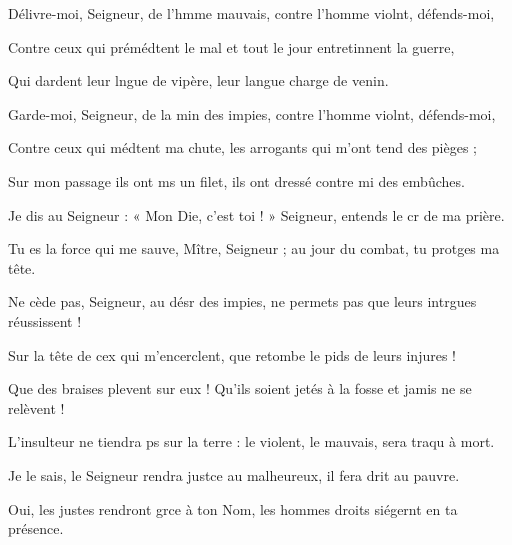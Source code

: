 \item Délivre-moi, Seigneur, de l’hmme mauvais,\psstar{} contre l’homme violnt, défends-moi,
\item Contre ceux qui prémédtent le mal\psstar{} et tout le jour entretinnent la guerre,
\item Qui dardent leur lngue de vipère,\psstar{} leur langue charge de venin.
\item Garde-moi, Seigneur, de la min des impies,\psstar{} contre l’homme violnt, défends-moi, 
\item Contre ceux qui médtent ma chute,\psstar{} les arrogants qui m’ont tend des pièges ; 
\item Sur mon passage ils ont ms un filet,\psstar{} ils ont dressé contre mi des embûches.
\item Je dis au Seigneur : « Mon Die, c’est toi ! »\psstar{} Seigneur, entends le cr de ma prière.
\item Tu es la force qui me sauve, Mître, Seigneur ;\psstar{} au jour du combat, tu protges ma tête.
\item Ne cède pas, Seigneur, au désr des impies,\psstar{} ne permets pas que leurs intrgues réussissent !
\item Sur la tête de cex qui m’encerclent,\psstar{} que retombe le pids de leurs injures !
\item Que des braises plevent sur eux !\psstar{} Qu’ils soient jetés à la fosse et jamis ne se relèvent !
\item L’insulteur ne tiendra ps sur la terre :\psstar{} le violent, le mauvais, sera traqu à mort.
\item Je le sais, le Seigneur rendra justce au malheureux,\psstar{} il fera drit au pauvre.
\item Oui, les justes rendront grce à ton Nom,\psstar{} les hommes droits siégernt en ta présence.